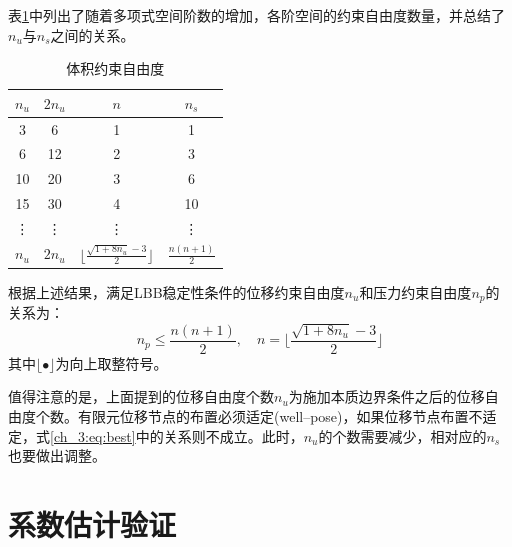 表\ref{ch_3:tab:constraint}中列出了随着多项式空间阶数的增加，各阶空间的约束自由度数量，并总结了$n_u$与$n_s$之间的关系。
\begin{table}[!h]
    \centering
    \caption{体积约束自由度}\label{ch_3:tab:constraint}
    \setlength{\tabcolsep}{10mm}
    \renewcommand{\arraystretch}{2}
    \begin{tabular}{cccc}
        \toprule
            $n_u$ & $2n_u$ & $n$ &$ n_s$\\
        \midrule
        3  & 6  & 1 & 1 \\
        6  & 12 & 2 & 3 \\
        10 & 20 & 3 & 6 \\
        15 & 30 & 4 & 10 \\
        \vdots & \vdots & \vdots & \vdots \\
        $n_u$ & $2n_u$ & $\lfloor\frac{\sqrt{1+8n_u}-3}{2}\rfloor$ & $\frac{n(n+1)}{2}$  \\
        \bottomrule
    \end{tabular}
\end{table}

根据上述结果，满足LBB稳定性条件的位移约束自由度$n_u$和压力约束自由度$n_p$的关系为：
\begin{equation}\label{ch_3:eq:best}
n_p\leq \frac{n(n+1)}{2},\quad n = \lfloor\frac{\sqrt{1+8n_u}-3}{2}\rfloor
\end{equation}
其中$\lfloor\bullet\rfloor$为向上取整符号。

值得注意的是，上面提到的位移自由度个数$n_u$为施加本质边界条件之后的位移自由度个数。有限元位移节点的布置必须适定(well--pose)，如果位移节点布置不适定，式\eqref{ch_3:eq:best}中的关系则不成立。此时，$n_u$的个数需要减少，相对应的$n_s$也要做出调整。
\section{系数估计验证}

